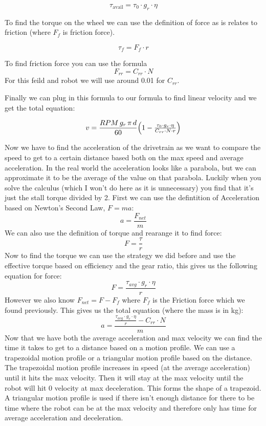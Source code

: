 \documentclass[11pt]{article}
\begin{document}
\[
  \tau_{\mathrm{avail}} = \tau_{0} \cdot g_r \cdot \eta
\]

To find the torque on the wheel we can use the definition of force as is relates to friction (where \(F_{f}\) is friction force).

\[
  \tau_{f} = F_{f} \cdot r
\]

To find friction force you can use the formula
\[
  F_{rr} = C_{rr} \cdot N
\]
For this feild and robot we will use around 0.01 for \(C_{rr}\).

Finally we can plug in this formula to our formula to find linear velocity and we get the total equation:

\[
  v = \frac{RPM\,g_r\,\pi\,d}{60}\Bigl(1 - \tfrac{\tau_{0} \cdot g_r \cdot \eta}{C_{rr} \cdot N \cdot r}\Bigr)
\]

Now we have to find the acceleration of the drivetrain as we want to compare the speed to get to a certain distance based both on the max speed and average acceleration. In the real world the acceleration looks like a parabola, but we can approximate it to be the average of the value on that parabola. Luckily when you solve the calculus (which I won't do here as it is unnecessary) you find that it's just the stall torque divided by 2. First we can use the defintition of Acceleration based on Newton's Second Law, \(F = ma\):
\[
  a = \frac{F_{net}}{m}
\]
We can also use the definition of torque and rearange it to find force:
\[
  F = \frac{\tau}{r}
\]
Now to find the torque we can use the strategy we did before and use the effective torque based on efficiency and the gear ratio, this gives us the following equation for force:
\[
  F = \frac{\tau_{avg} \cdot g_r \cdot \eta}{r}
\]
However we also know \(F_{net} = F - F_f\) where \(F_f\) is the Friction force which we found previously. This gives us the total equation (where the mass is in kg):
\[
  a = \frac{\frac{\tau_{avg} \cdot g_r \cdot \eta}{r} - C_{rr} \cdot N}{m}
\]
Now that we have both the average acceleration and max velocity we can find the time it takes to get to a distance based on a motion profile. We can use a trapezoidal motion profile or a triangular motion profile based on the distance. The trapezoidal motion profile increases in speed (at the average acceleration) until it hits the max velocity. Then it will stay at the max velocity until the robot will hit 0 velocity at max deceleration. This forms the shape of a trapezoid. A triangular motion profile is used if there isn't enough distance for there to be time where the robot can be at the max velocity and therefore only has time for average acceleration and deceleration.
\end{document}
